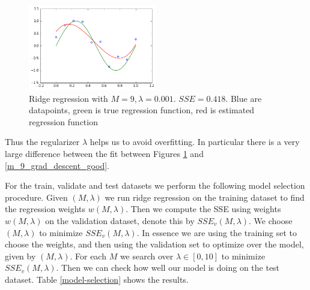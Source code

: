 \documentclass{article}
\begin{document}
%
\begin{figure}[h]
\centering
\includegraphics[width=0.5\textwidth]{m_3_lam_0-001}
\caption{Ridge regression with $M = 9, \lambda = 0.001$. $SSE = 0.418$. Blue are datapoints, green is true regression function, red is estimated regression function}
\label{ridge_m_9_lam_0-001}
\end{figure}
%
Thus the regularizer $\lambda$ helps us to avoid overfitting. In particular there is a very large difference between the fit between Figures \ref{ridge_m_9_lam_0-001} and \ref{m_9_grad_descent_good}.

For the train, validate and test datasets we perform the following model selection procedure. Given $(M,\lambda)$ we run ridge regression on the training dataset to find the regression weights $w(M,\lambda)$. Then we compute the SSE using weights $w(M,\lambda)$ on the validation dataset, denote this by $SSE_v(M,\lambda)$. We choose $(M,\lambda)$ to minimize $SSE_v(M,\lambda)$. In essence we are using the training set to choose the weights, and then using the validation set to optimize over the model, given by $(M,\lambda)$. For each $M$ we search over $\lambda \in [0,10]$ to minimize $SSE_v(M,\lambda)$. Then we can check how well our model is doing on the test dataset. Table \ref{model-selection} shows the results.
\end{document}
